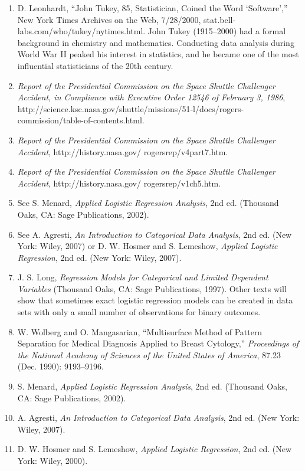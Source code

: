 \documentclass[
]{report}
\begin{document}
\begin{enumerate}

\item D. Leonhardt, “John Tukey, 85, Statistician, Coined the Word ‘Software’,” New York Times Archives on the Web, 7/28/2000, stat.bell-labs.com/who/tukey/nytimes.html. John Tukey (1915–2000) had a formal background in chemistry and mathematics. Conducting data analysis during World War II peaked his interest in statistics, and he became one of the most influential statisticians of the 20th century.
\item \textit{Report of the Presidential Commission on the Space Shuttle Challenger Accident, in Compliance with Executive Order 12546 of February 3, 1986}, http://science.ksc.nasa.gov/shuttle/missions/51-l/docs/rogers-commission/table-of-contents.html.
\item \textit{Report of the Presidential Commission on the Space Shuttle Challenger Accident}, http://history.nasa.gov/
rogersrep/v4part7.htm.
\item \textit{Report of the Presidential Commission on the Space Shuttle Challenger Accident}, http://history.nasa.gov/
rogersrep/v1ch5.htm.
\item See S. Menard, \textit{Applied Logistic Regression Analysis}, 2nd ed. (Thousand Oaks, CA: Sage Publications, 2002).
\item See A. Agresti, \textit{An Introduction to Categorical Data Analysis}, 2nd ed. (New York: Wiley, 2007) or D. W. Hosmer and S. Lemeshow, \textit{Applied Logistic Regression}, 2nd ed. (New York: Wiley, 2007).
\item J. S. Long, \textit{Regression Models for Categorical and Limited Dependent Variables} (Thousand Oaks, CA: Sage Publications, 1997). Other texts will show that sometimes exact logistic regression models can be created in data sets with only a small number of observations for binary outcomes.
\item W. Wolberg and O. Mangasarian, “Multisurface Method of Pattern Separation for Medical Diagnosis Applied to Breast Cytology,” \textit{Proceedings of the National Academy of Sciences of the United States of America}, 87.23 (Dec. 1990): 9193–9196.
\item S. Menard, \textit{Applied Logistic Regression Analysis}, 2nd ed. (Thousand Oaks, CA: Sage Publications, 2002).
\item A. Agresti, \textit{An Introduction to Categorical Data Analysis}, 2nd ed. (New York: Wiley, 2007).
\item D. W. Hosmer and S. Lemeshow, \textit{Applied Logistic Regression}, 2nd ed. (New York: Wiley, 2000).

\end{enumerate}
\end{document}
